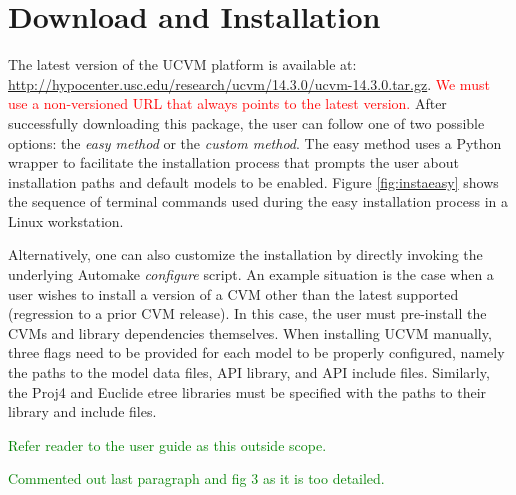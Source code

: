 
\section{Download and Installation}
\label{sec:installation}

The latest version of the UCVM platform is available at:
%
\url{http://hypocenter.usc.edu/research/ucvm/14.3.0/ucvm-14.3.0.tar.gz}. 
\textcolor{red}{We must use a non-versioned URL that always points to the latest version.}
%
After successfully downloading this package, the user can follow one of two possible options: the \textit{easy method} or the \textit{custom method}. The easy method uses a Python wrapper to facilitate the installation process that prompts the user about installation paths and default models to be enabled. Figure \ref{fig:instaeasy} shows the sequence of terminal commands used during the easy installation process in a Linux workstation.



Alternatively, one can also customize the installation by directly invoking the underlying Automake \emph{configure} script. An example situation is the case when a user wishes to install a version of a CVM other than the latest supported (regression to a prior CVM release). In this case, the user must pre-install the CVMs and library dependencies themselves. When installing UCVM manually, three flags need to be provided for each model to be properly configured, namely the paths to the model data files, API library, and API include files. Similarly, the Proj4 and Euclide etree libraries must be specified with the paths to their library and include files. 

\textcolor{green}{Refer reader to the user guide as this outside scope.}

\textcolor{green}{Commented out last paragraph and fig 3 as it is too detailed.}


%

